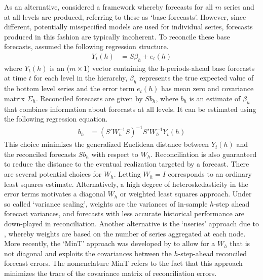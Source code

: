 \documentclass[a4paper,fleqn,11pt]{article}
\begin{document}
As an alternative, \cite{Hyndman2011} considered a framework whereby forecasts for all $m$ series and at all levels are produced, referring to these as `base forecasts'.  However, since different, potentially misspecified models are used for individual series, forecasts produced in this fashion are typically incoherent. To reconcile these base forecasts, \cite{Hyndman2011} assumed the following regression structure.
\begin{align}
Y_t(h) &= S\beta_{h} + e_t(h)
\label{eq:regstruct}
\end{align}
where $Y_t(h)$ is an ($m \times 1$) vector containing the h-periods-ahead base forecasts at time $t$ for each level in the hierarchy, $\beta_{h}$ represents the true expected value of the bottom level series and the error term $e_t(h)$ has mean zero and covariance matrix $\Sigma_h$. Reconciled forecasts are given by $Sb_{h}$, where $b_h$ is an estimate of $\beta_{h}$ that combines information about forecasts at all levels. It can be estimated using the following regression equation.
\begin{align}
\label{eq:reg}
b_{h} &= \left(S'W_h^{-1}S \right)^{-1} S'W_h^{-1}Y_t(h)
\end{align}
This choice minimizes the generalized Euclidean distance between $Y_t(h)$ and the reconciled forecasts $Sb_{h}$ with respect to $W_h$. Reconciliation is also guaranteed to reduce the distance to the eventual realization targeted by a forecast. There are several potential choices for $W_h$. Letting $W_h=I$ corresponds to an ordinary least squares estimate.  Alternatively, a high degree of heteroskedasticity in the error terms motivates a diagonal $W_h$ or weighted least squares approach. Under so called `variance scaling', weights are the variances of in-sample $h$-step ahead forecast variances, and forecasts with less accurate historical performance are down-played in reconciliation.  Another alternative is the `nseries' approach due to \cite{Athanasopoulos2017}, whereby weights are based on the number of series aggregated at each node.  More recently, the `MinT' approach was developed by \cite{Wickramasuriya2015} to allow for a $W_h$ that is not diagonal and exploits the covariances between the $h$-step-ahead reconciled forecast errors. The nomenclature MinT refers to the fact that this approach minimizes the trace of the covariance matrix of reconciliation errors.\\
\end{document}
